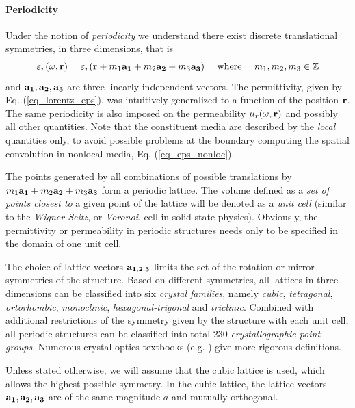 \paragraph{Periodicity}%
Under the notion of \textit{periodicity} we understand there exist discrete translational symmetries, in three dimensions, that is 
\begin{equation} \varepsilon_r(\omega,{\mathbf{r}}) = \varepsilon_r({\mathbf{r}} + m_1 {\mathbf{a_1}} + m_2 {\mathbf{a_2}} + m_3 {\mathbf{a_3}}) \quad\text{ where }\quad m_1, m_2, m_3 \in \mathbb{Z} \label{eq_trsym}\end{equation}
and ${\mathbf{a_1}}, {\mathbf{a_2}}, {\mathbf{a_3}}$ are three linearly independent vectors. The permittivity, given by Eq. (\ref{eq_lorentz_eps}), was intuitively generalized to a function of the position ${\mathbf{r}}$. The same periodicity is also imposed on the permeability $\mu_r(\omega,{\mathbf{r}})$ and possibly all other quantities. Note that the constituent media are described by the \textit{local} quantities only, to avoid possible problems at the boundary computing the spatial convolution  in nonlocal media, Eq. (\ref{eq_eps_nonloc}). 

The points generated by all combinations of possible translations by $m_1 {\mathbf{a_1}} + m_2 {\mathbf{a_2}} + m_3 {\mathbf{a_3}}$ form a periodic lattice.
The volume defined as a \textit{set of points closest to} a given point of the lattice will be denoted as a \textit{unit cell} (similar to the \textit{Wigner-Seitz}, or \textit{Voronoi}, cell in solid-state physics). Obviously, the permittivity or permeability in periodic structures needs only to be specified in the domain of one unit cell.

The choice of lattice vectors ${\mathbf{a_{1,2,3}}}$ limits the set of the rotation or mirror symmetries of the structure. Based on different symmetries, all lattices in three dimensions can be classified into six \textit{crystal families}, namely \textit{cubic}, \textit{tetragonal}, \textit{ortorhombic}, \textit{monoclinic}, \textit{hexagonal-trigonal} and \textit{triclinic}. Combined with additional restrictions of the symmetry given by the structure with each unit cell, all periodic structures can be classified into total 230 \textit{crystallographic point groups}. Numerous crystal optics textbooks (e.g. \cite[p. 678]{born1999book}) give more rigorous definitions. 

Unless stated otherwise, we will assume that the cubic lattice is used, which allows the highest possible symmetry. In the cubic lattice, the lattice vectors ${\mathbf{a_1}}, {\mathbf{a_2}}, {\mathbf{a_3}}$ are of the same magnitude $a$ and mutually orthogonal. %

